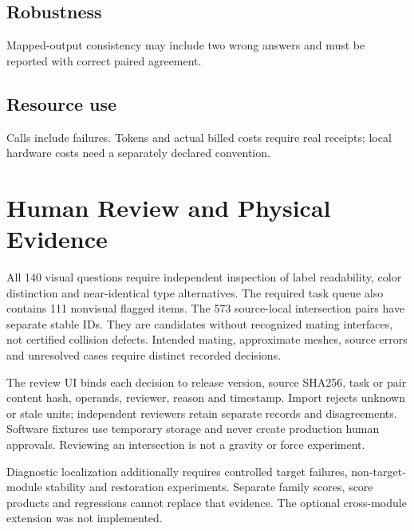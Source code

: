 \documentclass[10pt,letterpaper]{article}
\begin{document}
\subsection{Robustness}
\begin{center}\small\end{center}
Mapped-output consistency may include two wrong answers and must be
reported with correct paired agreement.
\subsection{Resource use}
\begin{center}\small\end{center}
Calls include failures. Tokens and actual billed costs require real
receipts; local hardware costs need a separately declared convention.

\clearpage\section{Human Review and Physical Evidence}
All 140 visual questions require independent inspection of label
readability, color distinction and near-identical type alternatives.
The required task queue also contains 111 nonvisual flagged items.
The 573 source-local intersection pairs have separate stable IDs.
They are candidates without recognized mating interfaces, not certified
collision defects. Intended mating, approximate meshes, source errors
and unresolved cases require distinct recorded decisions.
\begin{center}\small\end{center}
\begin{center}\small\end{center}
The review UI binds each decision to release version, source SHA256,
task or pair content hash, operands, reviewer, reason and timestamp.
Import rejects unknown or stale units; independent reviewers retain
separate records and disagreements. Software fixtures use temporary
storage and never create production human approvals.
Reviewing an intersection is not a gravity or force experiment.

Diagnostic localization additionally requires controlled target
failures, non-target-module stability and restoration experiments.
Separate family scores, score products and regressions cannot replace
that evidence. The optional cross-module extension was not implemented.
\end{document}
